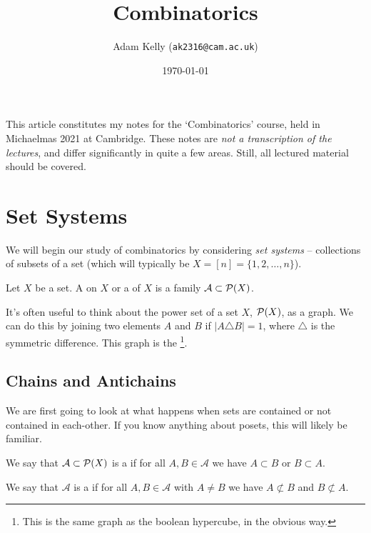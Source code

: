 \documentclass[a4paper]{scrartcl}
\title{Combinatorics}
\author{Adam Kelly (\texttt{ak2316@cam.ac.uk})}
\date{\today}
\newcommand{\A}{\mathcal{A}}
\begin{document}
\maketitle


This article constitutes my notes for the `Combinatorics' course, held in Michaelmas 2021 at Cambridge. These notes are \emph{not a transcription of the lectures}, and differ significantly in quite a few areas. Still, all lectured material should be covered.



\tableofcontents



\section{Set Systems}
 
We will begin our study of combinatorics by considering \emph{set systems} -- collections of subsets of a set (which will typically be $X = [n] = \{1, 2, \dots, n\}$).

\begin{definition}
Let $X$ be a set. A  on $X$ or a  of $X$ is a family $\A \subset \power(X)$.
\end{definition}

It's often useful to think about the power set of a set $X$, $\mathcal{P}(X)$, as a graph. We can do this by joining two elements $A$ and $B$ if $|A \triangle B| = 1$, where $\triangle$ is the symmetric difference.
This graph is the \footnote{This is the same graph as the boolean hypercube, in the obvious way.}.


\subsection{Chains and Antichains}

We are first going to look at what happens when sets are contained or not contained in each-other. If you know anything about posets, this will likely be familiar. 

\begin{definition}
We say that $\A \subset \power(X)$ is a  if for all $A, B \in \A$ we have $A \subset B$ or $B \subset A$.

We say that $\A$ is a  if for all $A, B \in \A$ with $A \neq B$ we have $A \not \subset B$ and $B \not \subset A$.
\end{definition}
\end{document}
